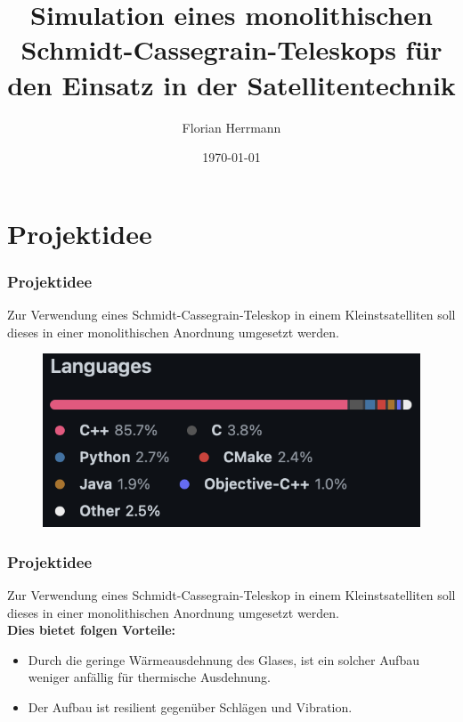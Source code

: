 \documentclass{beamer}
\begin{document}
\title{Simulation eines monolithischen Schmidt-Cassegrain-Teleskops für den Einsatz in der Satellitentechnik}   
\author{Florian Herrmann} 
\date{\today}

\begin{frame}
\titlepage
\end{frame}

\section{Projektidee}
\begin{frame} \frametitle{Projektidee}
	Zur Verwendung eines Schmidt-Cassegrain-Teleskop in  einem Kleinstsatelliten soll dieses in einer monolithischen Anordnung umgesetzt werden.
	\begin{figure}
		\centering
		\includegraphics[width=\textwidth]{Bilder/CodeBase.png}
		\label{a4}
	\end{figure}
\end{frame}

\begin{frame} \frametitle{Projektidee}
	Zur Verwendung eines Schmidt-Cassegrain-Teleskop in  einem Kleinstsatelliten soll dieses in einer monolithischen Anordnung umgesetzt werden.\\
	\textbf{Dies bietet folgen Vorteile:}\\
	\begin{itemize}
		\item  Durch die geringe  Wärmeausdehnung des Glases, ist ein solcher Aufbau weniger anfällig für thermische Ausdehnung. \pause
		\item Der Aufbau ist resilient gegenüber  Schlägen und Vibration.
	\end{itemize}
\end{frame}
\end{document}
